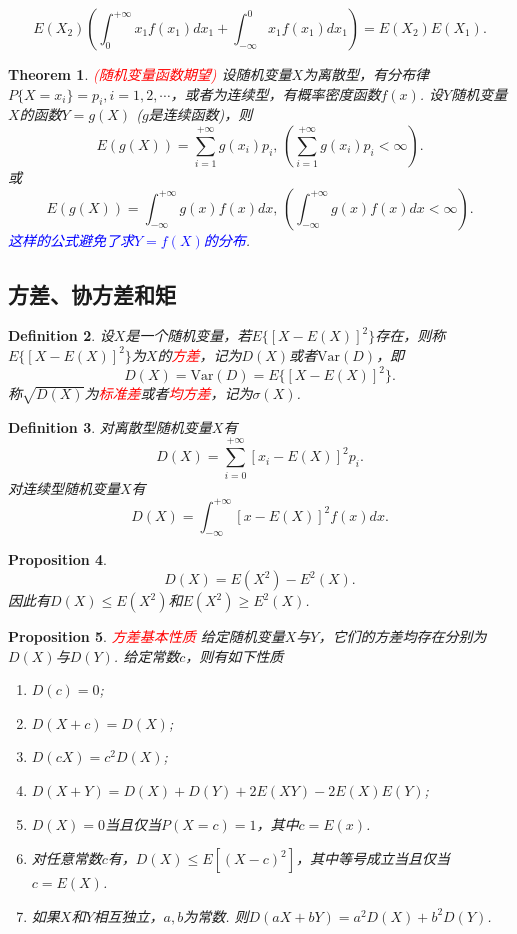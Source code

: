 \documentclass{article}
\newtheorem{theorem}{Theorem}[section]
\newtheorem{proposition}[theorem]{Proposition}
\newtheorem{definition}[theorem]{Definition}
\newcommand{\redt}[1]{\textcolor{red}{#1}}
\newcommand{\bluet}[1]{\textcolor{blue}{#1}}
\begin{document}
$$
E(X_2)\left(\int_0^{+\infty}x_1f(x_1)dx_1 +\int_{-\infty}^0x_1f(x_1)dx_1\right) = E(X_2)E(X_1).
$$


\begin{theorem}
\rm \redt{(随机变量函数期望)} 设随机变量$X$为离散型，有分布律$P\{X=x_i\}=p_i,i=1,2,\cdots$，或者为连续型，有概率密度函数$f(x)$. 设$Y$随机变量$X$的函数$Y=g(X)$ ($g$是连续函数)，则
$$
E(g(X))=\sum\limits_{i=1}^{+\infty}g(x_i)p_i,\,\left(\sum\limits_{i=1}^{+\infty}g(x_i)p_i < \infty \right) .
$$
或
$$
E(g(X)) = \int_{-\infty}^{+\infty}g(x)f(x)dx,\, \left(\int_{-\infty}^{+\infty}g(x)f(x)dx < \infty\right).
$$
\bluet{这样的公式避免了求$Y=f(X)$的分布}.
\end{theorem}

\newpage
\subsection{方差、协方差和矩}

\begin{definition}
\rm 设$X$是一个随机变量，若$E\{\left[X-E(X)\right]^2\}$存在，则称$E\{\left[X-E(X)\right]^2\}$为$X$的\redt{方差}，记为$D(X)$或者$\text{Var}(D)$，即
$$
D(X) = \text{Var}(D) = E\{\left[X-E(X)\right]^2\}.
$$
称$\sqrt{D(X)}$为\redt{标准差}或者\redt{均方差}，记为$\sigma(X)$. 
\end{definition}

\begin{definition}
\rm  对离散型随机变量$X$有
$$
D(X) = \sum\limits_{i = 0}^{+\infty} \left[ x_i - E(X) \right]^2 p_i.
$$
对连续型随机变量$X$有
$$
D(X) = \int_{-\infty}^{+\infty}\left[x-E(X)\right]^2f(x)dx.
$$
\end{definition}

\begin{proposition}
\rm 
$$
D(X)= E(X^2) - E^2(X). 
$$
因此有$D(X) \leq E(X^2)$和$E(X^2) \geq E^2(X)$.
\end{proposition}


\begin{proposition}
\rm \redt{方差基本性质} 给定随机变量$X$与$Y$，它们的方差均存在分别为$D(X)$与$D(Y)$. 给定常数$c$，则有如下性质
\begin{enumerate}
	\item $D(c) = 0$;
	\item $D(X+c) = D(X)$;
	\item $D(cX) = c^2D(X)$;
	\item $D(X+Y) = D(X)+D(Y)+2E(XY)-2E(X)E(Y)$;
	\item $D(X) = 0$当且仅当$P(X=c) = 1$，其中$c=E(x)$.
	\item 对任意常数$c$有，$D(X) \leq E[(X-c)^2]$，其中等号成立当且仅当$c = E(X)$.
	\item 如果$X$和$Y$相互独立，$a,b$为常数. 则$D(aX+bY)=a^2D(X)+b^2D(Y)$.
\end{enumerate}
\end{proposition}
\end{document}
